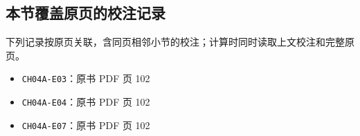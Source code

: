 \documentclass[
  10pt,
  fontset=fandol]{ctexart}
\providecommand{\tightlist}{%
  \setlength{\itemsep}{0pt}\setlength{\parskip}{0pt}}
\begin{document}
\subsection{本节覆盖原页的校注记录}\label{ux672cux8282ux8986ux76d6ux539fux9875ux7684ux6821ux6ce8ux8bb0ux5f55}

下列记录按原页关联，含同页相邻小节的校注；计算时同时读取上文校注和完整原页。

\begin{itemize}
\tightlist
\item
  \texttt{CH04A-E03}：原书 PDF 页 102
\item
  \texttt{CH04A-E04}：原书 PDF 页 102
\item
  \texttt{CH04A-E07}：原书 PDF 页 102
\end{itemize}
\end{document}
